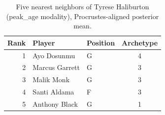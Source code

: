 \begin{table}[htbp]
  \centering\small
  \begin{tabular}{rllc}
    \toprule
    Rank & Player & Position & Archetype \\
    \midrule
    1 & Ayo Dosunmu & G & 4 \\
    2 & Marcus Garrett & G & 3 \\
    3 & Malik Monk & G & 3 \\
    4 & Santi Aldama & F & 3 \\
    5 & Anthony Black & G & 1 \\
    \bottomrule
  \end{tabular}
  \caption{Five nearest neighbors of Tyrese Haliburton (peak_age modality), Procrustes-aligned posterior mean.}
  \label{tab:Tyrese_Haliburton_neighbors_peak_age}
\end{table}

